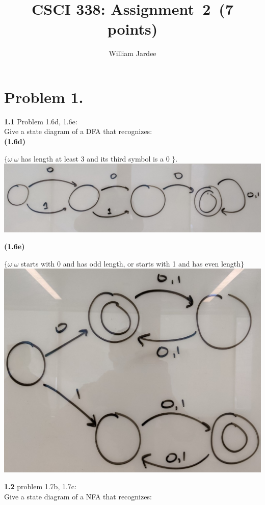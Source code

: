 \documentclass[11pt]{article}
\title{CSCI 338: Assignment~2~(7 points)}
\author{William Jardee}
\date{}
\begin{document}
\maketitle
 
\section*{Problem 1.}

\noindent
\textbf{1.1} Problem 1.6d, 1.6e:\\
Give a state diagram of a DFA that recognizes:\\

\textbf{(1.6d)}
    \begin{center}
        $\{\omega | \omega$ has length at least 3 and its third symbol is a 0 $\}$.\\
        \bigbreak
        \includegraphics[width = .9\textwidth]{images/homework02/answer1.6d.jpg}\\
    \end{center}
\bigbreak
\textbf{(1.6e)}
    \begin{center}
        $\{\omega | \omega$ starts with 0 and has odd length, or starts with 1 and has even length$\}$\\
        \bigbreak
        \includegraphics[width = .55\linewidth]{images/homework02/answer1.6e.jpg}\\
    \end{center}

\newpage




\noindent
\textbf{1.2} problem 1.7b, 1.7c:\\
Give a state diagram of a NFA that recognizes:\\
\end{document}
